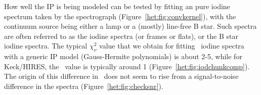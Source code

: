 How well the IP is being modeled can be tested by fitting an pure
iodine spectrum taken by the spectrograph
(Figure~\ref{het:fig:convkernel}), with the continuum source being
either a lamp or a (mostly) line-free B star. Such spectra are often
referred to as the iodine spectra (or frames or flats), or the B star
iodine spectra. The typical $\chi_\nu^2$ value that we obtain for
fitting \het\ iodine spectra with a generic IP model (Gauss-Hermite
polynomials) is about 2-5, while for Keck/HIRES, the \chisq\ value is
typically around 1 (Figure~\ref{het:fig:iodchunkcomp}). The origin of
this difference in \chisq\ does not seem to rise from a
signal-to-noise difference in the spectra
(Figure~\ref{het:fig:checksnr}).


